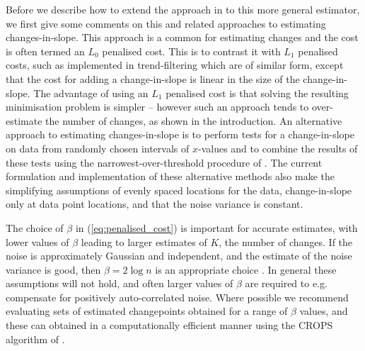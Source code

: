 \documentclass[nojss]{jss}
\begin{document}
Before we describe how to extend the approach in \cite{fearnhead2019detecting} to this more general estimator, we first give some comments on this and related approaches to estimating changes-in-slope. This approach is a common for estimating changes \citep{jackson2005algorithm,killick2012optimal} and the cost is often termed an $L_0$ penalised cost. This is to contrast it with $L_1$ penalised costs, such as implemented in trend-filtering \citep{kim2009ell_1,tibshirani2014adaptive} which are of similar form, except that the cost for adding a change-in-slope is linear in the size of the change-in-slope. The advantage of using an $L_1$ penalised cost is that solving the resulting minimisation problem is simpler -- however such an approach tends to over-estimate the number of changes, as shown in the introduction. An alternative approach to estimating changes-in-slope is to perform tests for a change-in-slope on data from randomly chosen intervals of $x$-values and to combine the results of these tests using the narrowest-over-threshold procedure of \cite{baranowski2016narrowest}. The current formulation and implementation of these alternative methods also make the simplifying assumptions of evenly spaced locations for the data, change-in-slope only at data point locations, and that the noise variance is constant. %

The choice of $\beta$ in (\ref{eq:penalised_cost}) is important for accurate estimates, with lower values of $\beta$ leading to larger estimates of $K$, the number of changes. If the noise is approximately Gaussian and independent, and the estimate of the noise variance is good, then $\beta=2\log n$ is an appropriate choice  \citep{fearnhead2019detecting}. In general these assumptions will not hold, and often larger values of $\beta$ are required to e.g. compensate for positively auto-correlated noise. Where possible we recommend evaluating sets of estimated changepoints obtained for a range of $\beta$ values, and these can obtained in a computationally efficient manner using the CROPS algorithm of \cite{haynes2017computationally}.
\end{document}
